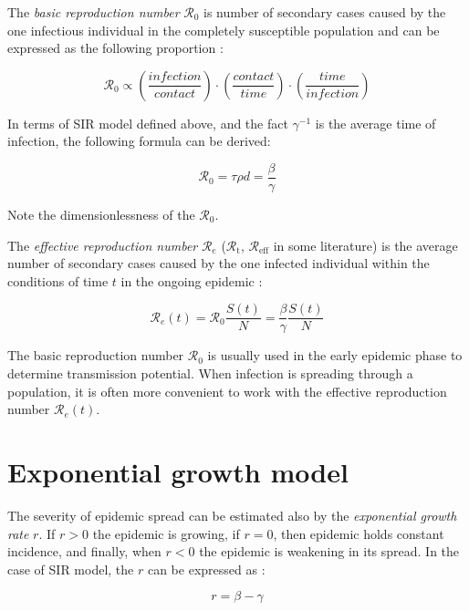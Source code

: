 \documentclass[
  digital, %
  oneside, %
  lof,     %
  lot,     %
]{fithesis4}
\begin{document}
The \textit{basic reproduction number} $\mathcal{R}_0$ is number 
of secondary cases caused by the one infectious individual 
in the completely susceptible population and can be expressed
as the following proportion \cite{jones2007}:

\begin{equation}
	\mathcal{R}_0 \propto \left(\frac{infection}{contact}\right)\cdot\left(\frac{contact}{time}\right)\cdot\left(\frac{time}{infection}\right)  
\end{equation}

In terms of SIR model defined above, and the fact $\gamma^{-1}$ is 
the average time of infection, the following formula can be derived:

\begin{equation}
	\mathcal{R}_0 = \tau \rho d = \frac{\beta}{\gamma}
\end{equation}

Note the dimensionlessness of the $\mathcal{R}_0$.

The \textit{effective reproduction number} $\mathcal{R}_e$ 
($\mathcal{R}_{\text{t}}$, $\mathcal{R}_{\text{eff}}$ in 
some literature) is the average number of secondary cases 
caused by the one infected individual within the 
conditions of time $t$ in the ongoing epidemic \cite{chowell2016}:

\begin{equation}
	\mathcal{R}_e(t) = \mathcal{R}_0 \frac{S(t)}{N} = \frac{\beta}{\gamma} \frac{S(t)}{N}
\end{equation}

The basic reproduction number $\mathcal{R}_0$ is usually used
in the early epidemic phase to determine transmission potential.
When infection is
spreading through a population, it is often more convenient
to work with the effective reproduction number $\mathcal{R}_e(t)$.

\section{Exponential growth model}

The severity of epidemic spread can be estimated also by the
\textit{exponential growth rate} $r$. If $r > 0$ the epidemic is growing,
if $r = 0$, then epidemic holds constant incidence, and finally, 
when $r < 0$ the epidemic is weakening in its spread.
In the case of SIR model, the $r$ can be expressed as \cite{ma2019}:

\begin{equation}
  r = \beta - \gamma
\end{equation}
\end{document}
